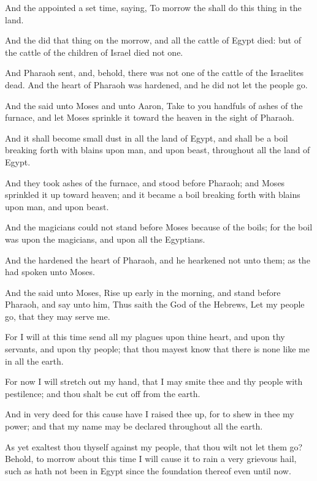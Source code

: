 \verse And the \LORD appointed a set time, saying, To morrow the \LORD shall do this thing in the land.

\verse And the \LORD did that thing on the morrow, and all the cattle of Egypt died: but of the cattle of the children of Israel died not one.

\verse And Pharaoh sent, and, behold, there was not one of the cattle of the Israelites dead. And the heart of Pharaoh was hardened, and he did not let the people go.

\verse And the \LORD said unto Moses and unto Aaron, Take to you handfuls of ashes of the furnace, and let Moses sprinkle it toward the heaven in the sight of Pharaoh.

\verse And it shall become small dust in all the land of Egypt, and shall be a boil breaking forth with blains upon man, and upon beast, throughout all the land of Egypt.

\verse And they took ashes of the furnace, and stood before Pharaoh; and Moses sprinkled it up toward heaven; and it became a boil breaking forth with blains upon man, and upon beast.

\verse And the magicians could not stand before Moses because of the boils; for the boil was upon the magicians, and upon all the Egyptians.

\verse And the \LORD hardened the heart of Pharaoh, and he hearkened not unto them; as the \LORD had spoken unto Moses.

\verse And the \LORD said unto Moses, Rise up early in the morning, and stand before Pharaoh, and say unto him, Thus saith the \LORD God of the Hebrews, Let my people go, that they may serve me.

\verse For I will at this time send all my plagues upon thine heart, and upon thy servants, and upon thy people; that thou mayest know that there is none like me in all the earth.

\verse For now I will stretch out my hand, that I may smite thee and thy people with pestilence; and thou shalt be cut off from the earth.

\verse And in very deed for this cause have I raised thee up, for to shew in thee my power; and that my name may be declared throughout all the earth.

\verse As yet exaltest thou thyself against my people, that thou wilt not let them go?  \verse Behold, to morrow about this time I will cause it to rain a very grievous hail, such as hath not been in Egypt since the foundation thereof even until now.

